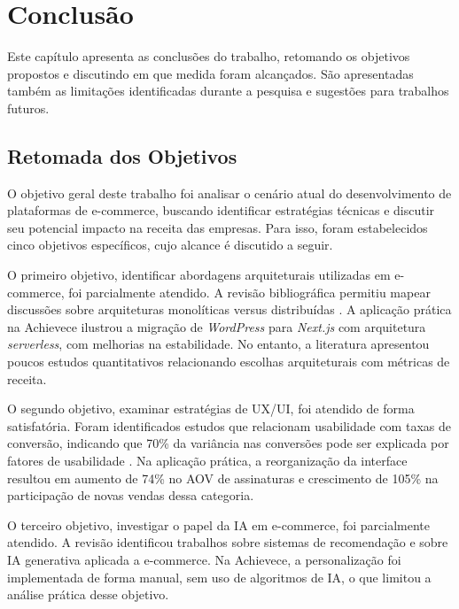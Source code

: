\chapter{Conclusão}
\label{ch:conclusao}

Este capítulo apresenta as conclusões do trabalho, retomando os objetivos propostos e discutindo em que medida foram alcançados. São apresentadas também as limitações identificadas durante a pesquisa e sugestões para trabalhos futuros.

\section{Retomada dos Objetivos}

O objetivo geral deste trabalho foi analisar o cenário atual do desenvolvimento de plataformas de e-commerce, buscando identificar estratégias técnicas e discutir seu potencial impacto na receita das empresas. Para isso, foram estabelecidos cinco objetivos específicos, cujo alcance é discutido a seguir.

O primeiro objetivo, identificar abordagens arquiteturais utilizadas em e-commerce, foi parcialmente atendido. A revisão bibliográfica permitiu mapear discussões sobre arquiteturas monolíticas versus distribuídas \cite{ubur_reviewing_2023}. A aplicação prática na Achievece ilustrou a migração de \textit{WordPress} para \textit{Next.js} com arquitetura \textit{serverless}, com melhorias na estabilidade. No entanto, a literatura apresentou poucos estudos quantitativos relacionando escolhas arquiteturais com métricas de receita.

O segundo objetivo, examinar estratégias de UX/UI, foi atendido de forma satisfatória. Foram identificados estudos que relacionam usabilidade com taxas de conversão, indicando que 70\% da variância nas conversões pode ser explicada por fatores de usabilidade \cite{nawir_impact_2024}. Na aplicação prática, a reorganização da interface resultou em aumento de 74\% no AOV de assinaturas e crescimento de 105\% na participação de novas vendas dessa categoria.

O terceiro objetivo, investigar o papel da IA em e-commerce, foi parcialmente atendido. A revisão identificou trabalhos sobre sistemas de recomendação \cite{nguyen_personalized_2024} e sobre IA generativa aplicada a e-commerce. Na Achievece, a personalização foi implementada de forma manual, sem uso de algoritmos de IA, o que limitou a análise prática desse objetivo.

